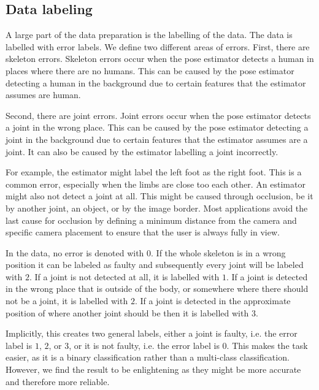 \subsection{Data labeling}
\label{sec:data_labeling}

A large part of the data preparation is the labelling of the data. The data is labelled with error labels. We define two different areas of errors. First, there are skeleton errors. Skeleton errors occur when the pose estimator detects a human in places where there are no humans. This can be caused by the pose estimator detecting a human in the background due to certain features that the estimator assumes are human.

Second, there are joint errors. Joint errors occur when the pose estimator detects a joint in the wrong place. This can be caused by the pose estimator detecting a joint in the background due to certain features that the estimator assumes are a joint. It can also be caused by the estimator labelling a joint incorrectly. 

For example, the estimator might label the left foot as the right foot. This is a common error, especially when the limbs are close too each other. An estimator might also not detect a joint at all. This might be caused through occlusion, be it by another joint, an object, or by the image border. Most applications avoid the last cause for occlusion by defining a minimum distance from the camera and specific camera placement to ensure that the user is always fully in view.

In the data, no error is denoted with $0$. If the whole skeleton is in a wrong position it can be labeled as faulty and subsequently every joint will be labeled with $2$. If a joint is not detected at all, it is labelled with $1$. If a joint is detected in the wrong place that is outside of the body, or somewhere where there should not be a joint, it is labelled with $2$. If a joint is detected in the approximate position of where another joint should be then it is labelled with $3$.

Implicitly, this creates two general labels, either a joint is faulty, i.e. the error label is $1$, $2$, or $3$, or it is not faulty, i.e. the error label is $0$. This makes the task easier, as it is a binary classification rather than a multi-class classification. However, we find the result to be enlightening as they might be more accurate and therefore more reliable.
